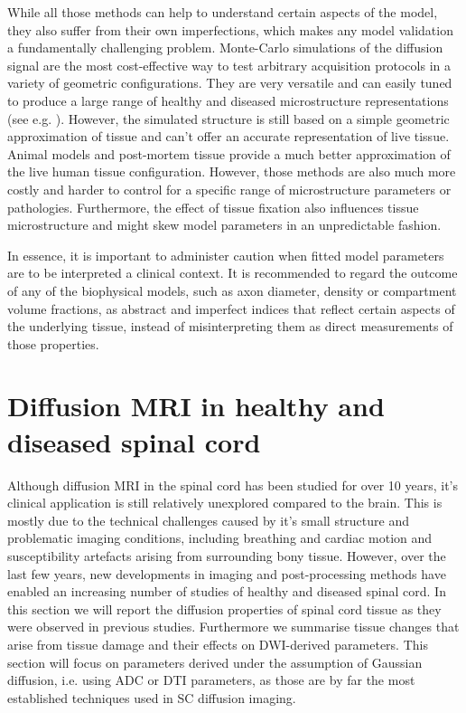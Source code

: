While all those methods can help to understand certain aspects of the model, they also suffer from their own imperfections, which makes any model validation a fundamentally challenging problem.  Monte-Carlo simulations of the diffusion signal are the most cost-effective way to test arbitrary acquisition protocols in a variety of geometric configurations\citep{Hall:2009}. They are very versatile and can easily tuned to produce a large range of healthy and diseased microstructure representations (see e.g. \citep{Harkins:2009,Nilsson:2013}). However, the simulated structure is still based on a simple geometric approximation of tissue and can't offer an accurate representation of live tissue. Animal models and post-mortem tissue provide a much better approximation of the live human tissue configuration. However, those methods are also much more costly and harder to control for a specific range of microstructure parameters or pathologies. Furthermore, the effect of tissue fixation also influences tissue microstructure and might skew model parameters in an unpredictable fashion\citep{Shepherd:2009,Dyrby:2010a}. 


In essence, it is important to administer caution when fitted model parameters are to be interpreted a clinical context. It is recommended to regard the outcome of any of the biophysical models, such as axon diameter, density or compartment volume fractions, as abstract and imperfect indices that reflect certain aspects of the underlying tissue, instead of misinterpreting them as direct measurements of those properties.




\section{Diffusion MRI in healthy and diseased spinal cord}
Although diffusion \gls{MRI} in the spinal cord has been studied for over 10 years, it's clinical application is still relatively unexplored compared to the brain. This is mostly due to the technical challenges caused by it's small structure and problematic imaging conditions, including breathing and cardiac motion and susceptibility artefacts arising from surrounding bony tissue. However, over the last few years, new developments in imaging and post-processing methods have enabled an increasing number of studies of healthy and diseased spinal cord. In this section we will report the diffusion properties of  spinal cord tissue as they were observed in previous studies. Furthermore we summarise tissue changes that arise from tissue damage  and their effects on \gls{DWI}-derived parameters. This section will focus on parameters derived under the assumption of Gaussian diffusion, i.e. using \gls{ADC} or \gls{DTI} parameters, as those are by far the most established techniques used in \gls{SC} diffusion imaging.

